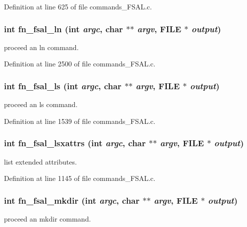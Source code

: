 Definition at line 625 of file commands\_\-FSAL.c.
\subsubsection[{fn\_\-fsal\_\-ln}]{\setlength{\rightskip}{0pt plus 5cm}int fn\_\-fsal\_\-ln (int {\em argc}, \/  char $\ast$$\ast$ {\em argv}, \/  FILE $\ast$ {\em output})}\label{commands__FSAL_8c_a8499a47dcd7307683cfde786a7bed5e2}
proceed an ln command. 

Definition at line 2500 of file commands\_\-FSAL.c.
\subsubsection[{fn\_\-fsal\_\-ls}]{\setlength{\rightskip}{0pt plus 5cm}int fn\_\-fsal\_\-ls (int {\em argc}, \/  char $\ast$$\ast$ {\em argv}, \/  FILE $\ast$ {\em output})}\label{commands__FSAL_8c_a07b7bb33d2fb103bd10446701b19015d}
proceed an ls command. 

Definition at line 1539 of file commands\_\-FSAL.c.
\subsubsection[{fn\_\-fsal\_\-lsxattrs}]{\setlength{\rightskip}{0pt plus 5cm}int fn\_\-fsal\_\-lsxattrs (int {\em argc}, \/  char $\ast$$\ast$ {\em argv}, \/  FILE $\ast$ {\em output})}\label{commands__FSAL_8c_a00fa31116fbbb892b0dfdd2b4b5d0c48}
list extended attributes. 

Definition at line 1145 of file commands\_\-FSAL.c.
\subsubsection[{fn\_\-fsal\_\-mkdir}]{\setlength{\rightskip}{0pt plus 5cm}int fn\_\-fsal\_\-mkdir (int {\em argc}, \/  char $\ast$$\ast$ {\em argv}, \/  FILE $\ast$ {\em output})}\label{commands__FSAL_8c_afba8a873b1230bb40c5b57b56f30e600}
proceed an mkdir command. 

